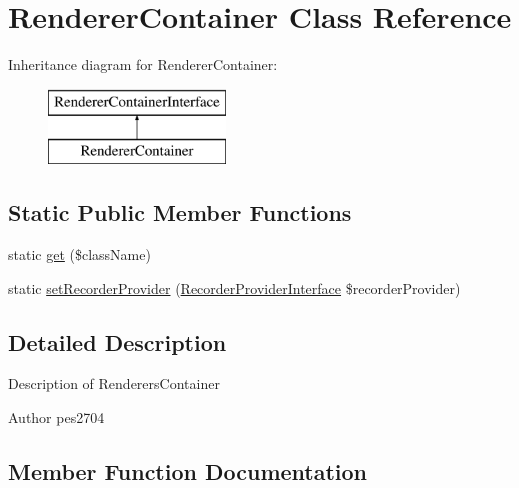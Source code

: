 \hypertarget{class_pes_1_1_view_1_1_renderer_1_1_renderer_container}{}\section{Renderer\+Container Class Reference}
\label{class_pes_1_1_view_1_1_renderer_1_1_renderer_container}
Inheritance diagram for Renderer\+Container\+:\begin{figure}[H]
\begin{center}
\leavevmode
\includegraphics[height=2.000000cm]{class_pes_1_1_view_1_1_renderer_1_1_renderer_container}
\end{center}
\end{figure}
\subsection*{Static Public Member Functions}
\begin{DoxyCompactItemize}
\item 
static \mbox{\hyperlink{class_pes_1_1_view_1_1_renderer_1_1_renderer_container_a0df693c0d02fe85325f46e6ce9a1ffb6}{get}} (\$class\+Name)
\item 
static \mbox{\hyperlink{class_pes_1_1_view_1_1_renderer_1_1_renderer_container_a068b4012f760f18deb809c5836409a52}{set\+Recorder\+Provider}} (\mbox{\hyperlink{interface_pes_1_1_view_1_1_recorder_1_1_recorder_provider_interface}{Recorder\+Provider\+Interface}} \$recorder\+Provider)
\end{DoxyCompactItemize}


\subsection{Detailed Description}
Description of Renderers\+Container

\begin{DoxyAuthor}{Author}
pes2704 
\end{DoxyAuthor}


\subsection{Member Function Documentation}
\mbox{\label{class_pes_1_1_view_1_1_renderer_1_1_renderer_container_a0df693c0d02fe85325f46e6ce9a1ffb6}} 
